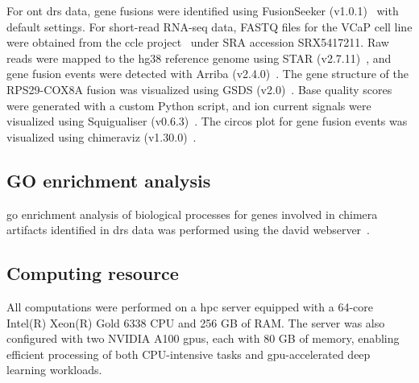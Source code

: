\documentclass[pdflatex,sn-nature, lineno]{sn-jnl}%
\begin{document}
For \gls{ont} \gls{drs} data, gene fusions were identified using FusionSeeker (v1.0.1)~\cite{chen2023gene} with default settings.
For short-read RNA-seq data, FASTQ files for the VCaP cell line were obtained from the \gls{ccle} project~\cite{barretina2012cancer} under SRA accession SRX5417211.
Raw reads were mapped to the hg38 reference genome using STAR (v2.7.11)~\cite{dobin2013star}, and gene fusion events were detected with Arriba (v2.4.0)~\cite{uhrig2021accurate}.
The gene structure of the RPS29-COX8A fusion was visualized using GSDS (v2.0)~\cite{hu2015gsds}.
Base quality scores were generated with a custom Python script, and ion current signals were visualized using Squigualiser (v0.6.3)~\cite{samarakoon2024interactive}.
The circos plot for gene fusion events was visualized using chimeraviz (v1.30.0)~\cite{laagstad2017chimeraviz}.

\subsection{GO enrichment analysis}

\gls{go} enrichment analysis of biological processes for genes involved in chimera artifacts identified in \gls{drs} data was performed using the \gls{david} webserver~\cite{sherman2022david}.

\subsection{Computing resource}

All computations were performed on a \gls{hpc} server equipped with a 64-core Intel(R) Xeon(R) Gold 6338 CPU and 256 GB of RAM. The server was also configured with two NVIDIA A100 \glspl{gpu}, each with 80 GB of memory, enabling efficient processing of both CPU-intensive tasks and \gls{gpu}-accelerated deep learning workloads.



\end{document}
